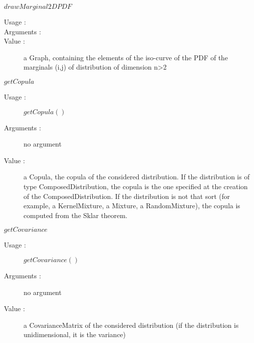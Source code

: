 \begin{description}
\begin{description}
    \bigskip

  \item $drawMarginal2DPDF$
    \begin{description}
    \item[Usage :] \rule{0pt}{1em}

    \item[Arguments :] \rule{0pt}{1em}
    \item[Value :] a Graph, containing the elements of the iso-curve of the PDF of the marginals (i,j) of distribution of dimension n>2
    \end{description}

    \bigskip

  \item $getCopula$
    \begin{description}
    \item[Usage :] $getCopula()$
    \item[Arguments :] no argument
    \item[Value :] a Copula, the copula of the considered distribution. If the distribution is of type ComposedDistribution, the copula is the one specified at the creation of the ComposedDistribution. If the distribution is not that sort (for example, a KernelMixture, a Mixture, a RandomMixture), the copula is computed from the Sklar theorem.
    \end{description}
    \bigskip

  \item $getCovariance$
    \begin{description}
    \item[Usage :] $getCovariance()$
    \item[Arguments :] no argument
    \item[Value :] a CovarianceMatrix of the considered distribution (if the distribution is unidimensional, it is the variance)
    \end{description}
    \bigskip


\end{description}
\end{description}
